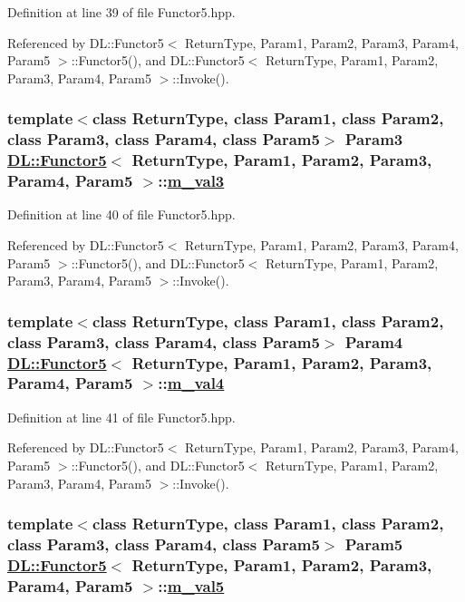 Definition at line 39 of file Functor5.hpp.

Referenced by DL::Functor5$<$ Return\-Type, Param1, Param2, Param3, Param4, Param5 $>$::Functor5(), and DL::Functor5$<$ Return\-Type, Param1, Param2, Param3, Param4, Param5 $>$::Invoke().\hypertarget{classDL_1_1Functor5_r3}{
\subsubsection[m\_\-val3]{\setlength{\rightskip}{0pt plus 5cm}template$<$class Return\-Type, class Param1, class Param2, class Param3, class Param4, class Param5$>$ Param3 \hyperlink{classDL_1_1Functor5}{DL::Functor5}$<$ Return\-Type, Param1, Param2, Param3, Param4, Param5 $>$::\hyperlink{classDL_1_1Functor5_r3}{m\_\-val3}}}
\label{classDL_1_1Functor5_r3}




Definition at line 40 of file Functor5.hpp.

Referenced by DL::Functor5$<$ Return\-Type, Param1, Param2, Param3, Param4, Param5 $>$::Functor5(), and DL::Functor5$<$ Return\-Type, Param1, Param2, Param3, Param4, Param5 $>$::Invoke().\hypertarget{classDL_1_1Functor5_r4}{
\subsubsection[m\_\-val4]{\setlength{\rightskip}{0pt plus 5cm}template$<$class Return\-Type, class Param1, class Param2, class Param3, class Param4, class Param5$>$ Param4 \hyperlink{classDL_1_1Functor5}{DL::Functor5}$<$ Return\-Type, Param1, Param2, Param3, Param4, Param5 $>$::\hyperlink{classDL_1_1Functor5_r4}{m\_\-val4}}}
\label{classDL_1_1Functor5_r4}




Definition at line 41 of file Functor5.hpp.

Referenced by DL::Functor5$<$ Return\-Type, Param1, Param2, Param3, Param4, Param5 $>$::Functor5(), and DL::Functor5$<$ Return\-Type, Param1, Param2, Param3, Param4, Param5 $>$::Invoke().\hypertarget{classDL_1_1Functor5_r5}{
\subsubsection[m\_\-val5]{\setlength{\rightskip}{0pt plus 5cm}template$<$class Return\-Type, class Param1, class Param2, class Param3, class Param4, class Param5$>$ Param5 \hyperlink{classDL_1_1Functor5}{DL::Functor5}$<$ Return\-Type, Param1, Param2, Param3, Param4, Param5 $>$::\hyperlink{classDL_1_1Functor5_r5}{m\_\-val5}}}
\label{classDL_1_1Functor5_r5}




